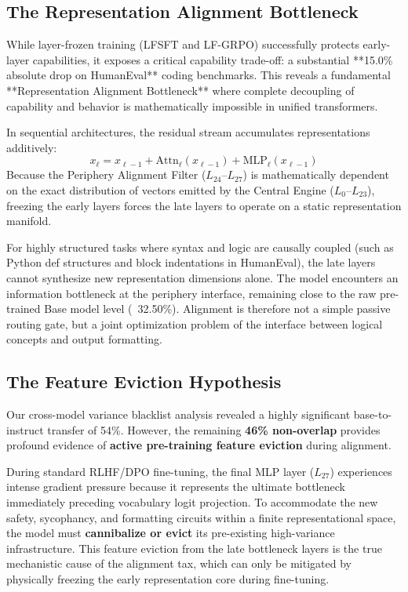 \documentclass[11pt]{article}
\begin{document}
\subsection{The Representation Alignment Bottleneck}

While layer-frozen training (LFSFT and LF-GRPO) successfully protects early-layer capabilities, it exposes a critical capability trade-off: a substantial **15.0\% absolute drop on HumanEval** coding benchmarks. This reveals a fundamental **Representation Alignment Bottleneck** where complete decoupling of capability and behavior is mathematically impossible in unified transformers.

In sequential architectures, the residual stream accumulates representations additively:
\begin{equation}
x_\ell = x_{\ell-1} + \text{Attn}_\ell(x_{\ell-1}) + \text{MLP}_\ell(x_{\ell-1})
\end{equation}
Because the Periphery Alignment Filter ($L_{24}$--$L_{27}$) is mathematically dependent on the exact distribution of vectors emitted by the Central Engine ($L_0$--$L_{23}$), freezing the early layers forces the late layers to operate on a static representation manifold. 

For highly structured tasks where syntax and logic are causally coupled (such as Python def structures and block indentations in HumanEval), the late layers cannot synthesize new representation dimensions alone. The model encounters an information bottleneck at the periphery interface, remaining close to the raw pre-trained Base model level (~32.50\%). Alignment is therefore not a simple passive routing gate, but a joint optimization problem of the interface between logical concepts and output formatting.

\subsection{The Feature Eviction Hypothesis}

Our cross-model variance blacklist analysis revealed a highly significant base-to-instruct transfer of 54\%. However, the remaining \textbf{46\% non-overlap} provides profound evidence of \textbf{active pre-training feature eviction} during alignment.

During standard RLHF/DPO fine-tuning, the final MLP layer ($L_{27}$) experiences intense gradient pressure because it represents the ultimate bottleneck immediately preceding vocabulary logit projection. To accommodate the new safety, sycophancy, and formatting circuits within a finite representational space, the model must \textbf{cannibalize or evict} its pre-existing high-variance infrastructure. This feature eviction from the late bottleneck layers is the true mechanistic cause of the alignment tax, which can only be mitigated by physically freezing the early representation core during fine-tuning.
\end{document}
